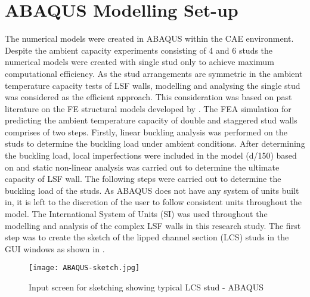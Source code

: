 \section{ABAQUS Modelling Set-up}

The numerical models were created in ABAQUS within the CAE environment. Despite the ambient capacity experiments consisting of 4 and 6 studs the numerical models were created with single stud only to achieve maximum computational efficiency. As the stud arrangements are symmetric in the ambient temperature capacity tests of LSF walls, modelling and analysing the single stud was considered as the efficient approach. This consideration was based on past literature on the FE structural models developed by \citet{Shahbazian2011,Gunalan2013f,Kesawan2016a,Ariyanayagam2019}. The FEA simulation for predicting the ambient temperature capacity of double and staggered stud walls comprises of two steps. Firstly, linear buckling analysis was performed on the studs to determine the buckling load under ambient conditions. After determining the buckling load, local imperfections were included in the model (d/150) based on \citet{Gunalan2013f} and static non-linear analysis was carried out to determine the ultimate capacity of LSF wall. The following steps were carried out to determine the buckling load of the studs. As ABAQUS does not have any system of units built in, it is left to the discretion of the user to follow consistent units throughout the model. The International System of Units (SI) was used throughout the modelling and analysis of the complex LSF walls in this research study. The first step was to create the sketch of the lipped channel section (LCS) studs in the GUI windows as shown in .
\begin{figure}[!htbp]
	\centering
			\texttt{[image: ABAQUS-sketch.jpg]}\\
		\caption{Input screen for sketching showing typical LCS stud - ABAQUS }
		\label{fig:ABAQUS-sketch}
\end{figure}

